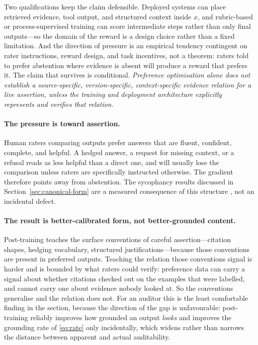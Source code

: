 Two qualifications keep the claim defensible. Deployed systems can place retrieved
evidence, tool output, and structured context inside $x$, and rubric-based or
process-supervised training can score intermediate steps rather than only final
outputs---so the domain of the reward is a design choice rather than a fixed limitation.
And the direction of pressure is an empirical tendency contingent on rater instructions,
reward design, and task incentives, not a theorem: raters told to prefer abstention
where evidence is absent will produce a reward that prefers it. The claim that survives
is conditional. \emph{Preference optimisation alone does not establish a
source-specific, version-specific, context-specific evidence relation for a live
assertion, unless the training and deployment architecture explicitly represents and
verifies that relation.}

\paragraph{The pressure is toward assertion.} Human raters comparing outputs
prefer answers that are fluent, confident, complete, and helpful. A hedged answer,
a request for missing context, or a refusal reads as less helpful than a direct
one, and will usually lose the comparison unless raters are specifically
instructed otherwise. The gradient therefore points away from abstention. The
sycophancy results discussed in Section~\ref{sec:canonical-form} are a measured
consequence of this structure \citep{sharma2024}, not an incidental defect.

\paragraph{The result is better-calibrated form, not better-grounded content.}
Post-training teaches the surface conventions of careful assertion---citation
shapes, hedging vocabulary, structured justifications---because those conventions
are present in preferred outputs. Teaching the relation those conventions signal is
harder and is bounded by what raters could verify: preference data can carry a signal
about whether citations checked out on the examples that were labelled, and cannot
carry one about evidence nobody looked at. So the conventions generalise and the
relation does not. For an auditor this is the least comfortable finding in the section,
because the direction of the gap is unfavourable: post-training reliably improves how
grounded an output \emph{looks} and improves the grounding rate of \eqref{eq:rate}
only incidentally, which widens rather than narrows the distance between apparent and
actual auditability.

